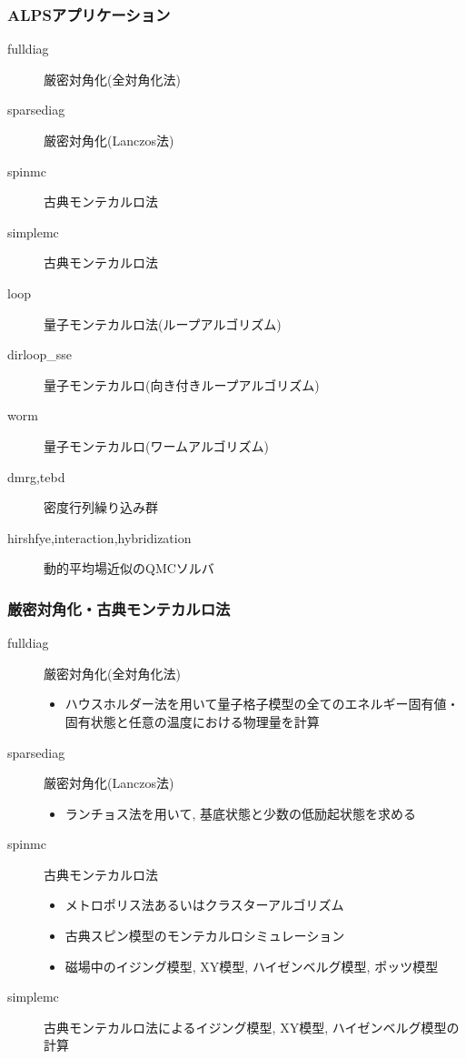 \begin{frame}[t,fragile]
  \frametitle{ALPSアプリケーション}
  \begin{description}
  \item[fulldiag] 厳密対角化(全対角化法)
  \item[sparsediag] 厳密対角化(Lanczos法)
  \item[spinmc] 古典モンテカルロ法
  \item[simplemc] 古典モンテカルロ法
  \item[loop] 量子モンテカルロ法(ループアルゴリズム)
  \item[dirloop\_sse] 量子モンテカルロ(向き付きループアルゴリズム)
  \item[worm] 量子モンテカルロ(ワームアルゴリズム)
  \item[dmrg,tebd] 密度行列繰り込み群
  \item[hirshfye,interaction,hybridization] 動的平均場近似のQMCソルバ
  \end{description}
\end{frame}

\begin{frame}[t,fragile]
  \frametitle{厳密対角化・古典モンテカルロ法}
  \begin{description}
  \item[fulldiag] 厳密対角化(全対角化法)
    \begin{itemize}
    \item ハウスホルダー法を用いて量子格子模型の全てのエネルギー固有値・固有状態と任意の温度における物理量を計算
    \end{itemize}
  \item[sparsediag] 厳密対角化(Lanczos法)
    \begin{itemize}
    \item ランチョス法を用いて, 基底状態と少数の低励起状態を求める
    \end{itemize}
  \item[spinmc] 古典モンテカルロ法
    \begin{itemize}
      \item メトロポリス法あるいはクラスターアルゴリズム
      \item 古典スピン模型のモンテカルロシミュレーション
      \item 磁場中のイジング模型, XY模型, ハイゼンベルグ模型, ポッツ模型
    \end{itemize}
  \item[simplemc] 古典モンテカルロ法によるイジング模型, XY模型, ハイゼンベルグ模型の計算
  \end{description}
\end{frame}


